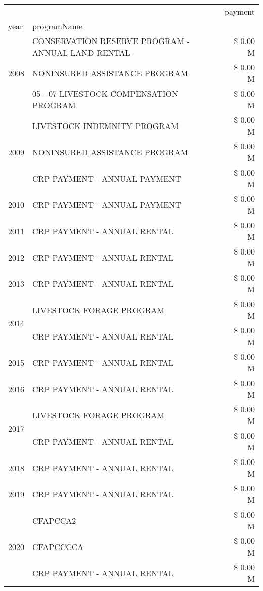 \begin{tabular}{llr}
\toprule
 &  & payment \\
year & programName &  \\
\midrule
\multirow[t]{3}{*}{2008} & CONSERVATION RESERVE PROGRAM - ANNUAL LAND RENTAL & \$ 0.00 M \\
 & NONINSURED ASSISTANCE PROGRAM & \$ 0.00 M \\
 & 05 - 07 LIVESTOCK COMPENSATION PROGRAM & \$ 0.00 M \\
\cline{1-3}
\multirow[t]{3}{*}{2009} & LIVESTOCK INDEMNITY PROGRAM & \$ 0.00 M \\
 & NONINSURED ASSISTANCE PROGRAM & \$ 0.00 M \\
 & CRP PAYMENT - ANNUAL PAYMENT & \$ 0.00 M \\
\cline{1-3}
2010 & CRP PAYMENT - ANNUAL PAYMENT & \$ 0.00 M \\
\cline{1-3}
2011 & CRP PAYMENT - ANNUAL RENTAL & \$ 0.00 M \\
\cline{1-3}
2012 & CRP PAYMENT - ANNUAL RENTAL & \$ 0.00 M \\
\cline{1-3}
2013 & CRP PAYMENT - ANNUAL RENTAL & \$ 0.00 M \\
\cline{1-3}
\multirow[t]{2}{*}{2014} & LIVESTOCK FORAGE PROGRAM & \$ 0.00 M \\
 & CRP PAYMENT - ANNUAL RENTAL & \$ 0.00 M \\
\cline{1-3}
2015 & CRP PAYMENT - ANNUAL RENTAL & \$ 0.00 M \\
\cline{1-3}
2016 & CRP PAYMENT - ANNUAL RENTAL                   & \$ 0.00 M \\
\cline{1-3}
\multirow[t]{2}{*}{2017} & LIVESTOCK FORAGE PROGRAM & \$ 0.00 M \\
 & CRP PAYMENT - ANNUAL RENTAL & \$ 0.00 M \\
\cline{1-3}
2018 & CRP PAYMENT - ANNUAL RENTAL & \$ 0.00 M \\
\cline{1-3}
2019 & CRP PAYMENT - ANNUAL RENTAL & \$ 0.00 M \\
\cline{1-3}
\multirow[t]{3}{*}{2020} & CFAPCCA2 & \$ 0.00 M \\
 & CFAPCCCCA & \$ 0.00 M \\
 & CRP PAYMENT - ANNUAL RENTAL & \$ 0.00 M \\
\cline{1-3}
\bottomrule
\end{tabular}
